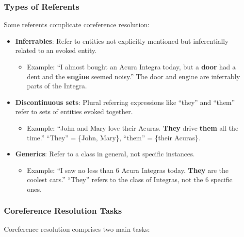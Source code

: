 \documentclass[11pt,a4paper]{article}
\begin{document}
\subsubsection{Types of Referents}

Some referents complicate coreference resolution:

\begin{itemize}
    \item \textbf{Inferrables}: Refer to entities not explicitly mentioned but inferentially related to an evoked entity.
    \begin{itemize}
        \item Example: ``I almost bought an Acura Integra today, but a \textbf{door} had a dent and the \textbf{engine} seemed noisy.'' The door and engine are inferrably parts of the Integra.
    \end{itemize}
    
    \item \textbf{Discontinuous sets}: Plural referring expressions like ``they'' and ``them'' refer to sets of entities evoked together.
    \begin{itemize}
        \item Example: ``John and Mary love their Acuras. \textbf{They} drive \textbf{them} all the time.'' ``They'' = \{John, Mary\}, ``them'' = \{their Acuras\}.
    \end{itemize}
    
    \item \textbf{Generics}: Refer to a class in general, not specific instances.
    \begin{itemize}
        \item Example: ``I saw no less than 6 Acura Integras today. \textbf{They} are the coolest cars.'' ``They'' refers to the class of Integras, not the 6 specific ones.
    \end{itemize}
\end{itemize}

\subsubsection{Coreference Resolution Tasks}

Coreference resolution comprises two main tasks:
\end{document}
